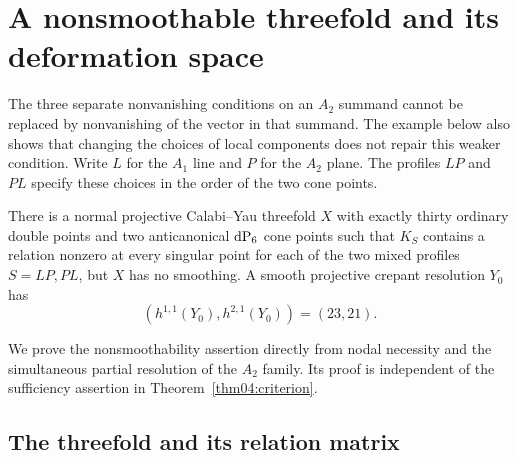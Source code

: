 \section{A nonsmoothable threefold and its deformation space}
\label{sec05:counterexample}

The three separate nonvanishing conditions on an $A_2$ summand cannot be
replaced by nonvanishing of the vector in that summand.  The example below
also shows that changing the choices of local components does not repair
this weaker condition.
Write $L$ for the $A_1$ line and $P$ for the $A_2$ plane.  The profiles
$LP$ and $PL$ specify these choices in the order of the two cone points.

\begin{theorem}\label{thm05:counterexample}
There is a normal projective Calabi--Yau threefold $X$ with exactly thirty
ordinary double points and two anticanonical $\mathrm{dP}_6$ cone points such that
$K_S$ contains a relation nonzero at every singular point for each of the
two mixed profiles $S=LP,PL$, but $X$ has no smoothing.  A smooth projective
crepant resolution $Y_0$ has
\[
 (h^{1,1}(Y_0),h^{2,1}(Y_0))=(23,21).
\]
\end{theorem}

We prove the nonsmoothability assertion directly
from nodal necessity and the simultaneous partial resolution of the
$A_2$ family.  Its proof is independent of the sufficiency assertion in
Theorem~\ref{thm04:criterion}.

\subsection{The threefold and its relation matrix}

